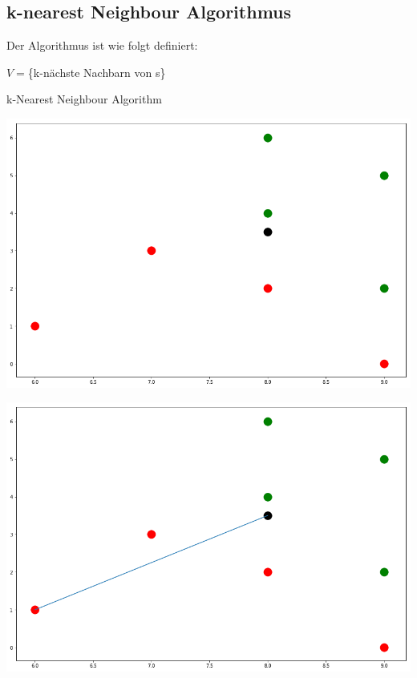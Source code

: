 \documentclass[a4paper]{scrartcl}
\begin{document}
\begin{multicols}{2}
                           
            \subsection{k-nearest Neighbour Algorithmus}
                Der Algorithmus ist wie folgt definiert:
                \begin{algorithm}[H]
                    $V= $\{k-nächste Nachbarn von s\}\;
                    {
                        \;
                    }
                           
                    \caption{k-Nearest Neighbour Algorithm}
                \end{algorithm}
                            
                \includegraphics[width=\linewidth]{nn1.png}
                            
                \includegraphics[width=\linewidth]{nn2.png}
                         

\end{multicols}
\end{document}
